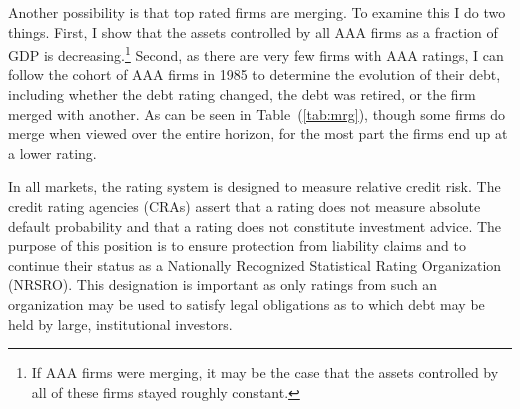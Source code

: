 \documentclass[notitlepage]{article}
\begin{document}
Another possibility is that top rated firms are merging. To examine this I do two things. First, I show that the assets controlled by all AAA firms as a fraction of GDP is decreasing.\footnote{If AAA firms were merging, it may be the case that the assets controlled by all of these firms stayed roughly constant.} Second, as there are very few firms with AAA ratings, I can follow the cohort of AAA firms in 1985 to determine the evolution of their debt, including whether the debt rating changed, the debt was retired, or the firm merged with another. As can be seen in Table~(\ref{tab:mrg}), though some firms do merge when viewed over the entire horizon, for the most part the firms end up at a lower rating.


In all markets, the rating system is designed to measure relative credit risk. The credit rating agencies (CRAs) assert that a rating does not measure absolute default probability and that a rating does not constitute investment advice. The purpose of this position is to ensure protection from liability claims and to continue their status as a Nationally Recognized Statistical Rating Organization (NRSRO). This designation is important as only ratings from such an organization may be used to satisfy legal obligations as to which debt may be held by large, institutional investors.
\end{document}
